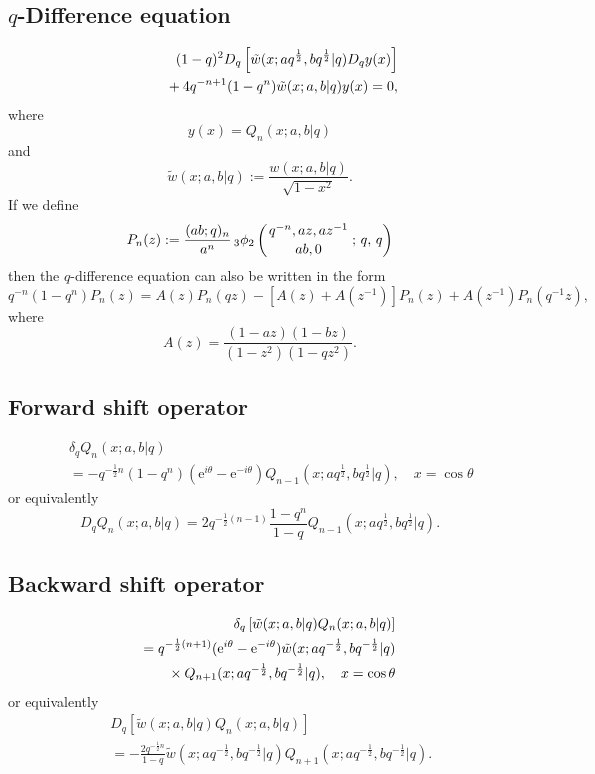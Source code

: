 \documentclass[envcountchap,graybox]{svmono}
\newcommand{\qhyp}[5]{\mbox{}_{#1}{\phi}_{#2}
\left(\genfrac{}{}{0pt}{}{#3}{#4}\,;\,q,\,#5\right)}
\newcommand{\mathindent}{\hspace{7.5mm}}
\newcommand{\e}{\textrm{e}}
\begin{document}
\newpage

\subsection*{$q$-Difference equation}
\begin{eqnarray}
\label{dvAlSalamChihara1}
& &(1-q)^2D_q\left[{\tilde w}(x;aq^{\frac{1}{2}},bq^{\frac{1}{2}}|q)D_qy(x)\right]\nonumber\\
& &{}\mathindent{}+4q^{-n+1}(1-q^n){\tilde w}(x;a,b|q)y(x)=0,
\end{eqnarray}
where
$$y(x)=Q_n(x;a,b|q)$$
and
$${\tilde w}(x;a,b|q):=\frac{w(x;a,b|q)}{\sqrt{1-x^2}}.$$
If we define
$$P_n(z):=\frac{(ab;q)_n}{a^n}\,\qhyp{3}{2}{q^{-n},az,az^{-1}}{ab,0}{q}$$
then the $q$-difference equation can also be written in the form
\begin{equation}
\label{dvAlSalamChihara2}
q^{-n}(1-q^n)P_n(z)=A(z)P_n(qz)-\left[A(z)+A(z^{-1})\right]P_n(z)
+A(z^{-1})P_n(q^{-1}z),
\end{equation}
where
$$A(z)=\frac{(1-az)(1-bz)}{(1-z^2)(1-qz^2)}.$$

\subsection*{Forward shift operator}
\begin{eqnarray}
\label{shift1AlSalamChiharaI}
& &\delta_qQ_n(x;a,b|q)\nonumber\\
& &{}=-q^{-\frac{1}{2}n}(1-q^n)(\e^{i\theta}-\e^{-i\theta})
Q_{n-1}(x;aq^{\frac{1}{2}},bq^{\frac{1}{2}}|q),\quad x=\cos\theta
\end{eqnarray}
or equivalently
\begin{equation}
\label{shift1AlSalamChiharaII}
D_qQ_n(x;a,b|q)=2q^{-\frac{1}{2}(n-1)}
\frac{1-q^n}{1-q}Q_{n-1}(x;aq^{\frac{1}{2}},bq^{\frac{1}{2}}|q).
\end{equation}

\subsection*{Backward shift operator}
\begin{eqnarray}
\label{shift2AlSalamChiharaI}
& &\delta_q\left[{\tilde w}(x;a,b|q)Q_n(x;a,b|q)\right]\nonumber\\
& &{}=q^{-\frac{1}{2}(n+1)}(\e^{i\theta}-\e^{-i\theta})
{\tilde w}(x;aq^{-\frac{1}{2}},bq^{-\frac{1}{2}}|q)\nonumber\\
& &{}\mathindent{}\times Q_{n+1}(x;aq^{-\frac{1}{2}},bq^{-\frac{1}{2}}|q),
\quad x=\cos\theta
\end{eqnarray}
or equivalently
\begin{eqnarray}
\label{shift2AlSalamChiharaII}
& &D_q\left[{\tilde w}(x;a,b|q)Q_n(x;a,b|q)\right]\nonumber\\
& &{}=-\frac{2q^{-\frac{1}{2}n}}{1-q}{\tilde w}(x;aq^{-\frac{1}{2}},bq^{-\frac{1}{2}}|q)
Q_{n+1}(x;aq^{-\frac{1}{2}},bq^{-\frac{1}{2}}|q).
\end{eqnarray}
\end{document}

